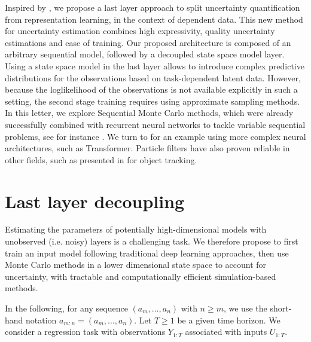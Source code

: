 \documentclass[journal]{IEEEtran}
\begin{document}
Inspired by \cite{Brosse2020OnLA}, we propose a last layer approach to split uncertainty quantification from representation learning, in the context of dependent data. This new method for uncertainty estimation combines high expressivity, quality uncertainty estimations and ease of training. Our proposed architecture is composed of an arbitrary sequential model, followed by a decoupled state space model layer. Using a state space model in the last layer allows to introduce complex predictive distributions for the observations based on task-dependent latent data. However, because the loglikelihood of the observations is not available explicitly in such a setting, the second stage training requires using approximate sampling methods. In this letter, we explore Sequential Monte Carlo methods, which were already successfully combined with recurrent neural networks to tackle variable sequential problems, see for instance \cite{naesseth2017variational,maddison2017filtering,Ma2020}.
We turn to \cite{Martin2020TheMC} for an example using more complex neural architectures, such as Transformer.
Particle filters have also proven reliable in other fields, such as presented in \cite{Liu2020LSTMPF} for object tracking.




\section{Last layer decoupling}
Estimating the parameters of potentially high-dimensional models with unobserved (i.e. noisy) layers is a challenging task.
We therefore propose to first train an input model following traditional deep learning approaches, then use Monte Carlo methods in a lower dimensional state space to account for uncertainty, with tractable and computationally efficient simulation-based methods.

In the following, for any sequence $(a_m,\ldots, a_n)$ with $n\geq m$, we use the short-hand notation $a_{m:n} = (a_m,\ldots, a_n)$.
Let $T\ge 1$ be a given time horizon.
We consider a regression task with observations $Y_{1:T}$ associated with inputs $U_{1:T}$.
\end{document}
